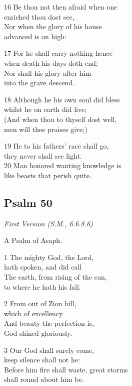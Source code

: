 \begin{multicols}{3}
16 Be thou not then afraid when one\\
enriched thou dost see,\\
Nor when the glory of his house\\
advanced is on high:

17 For he shall carry nothing hence\\
when death his days doth end;\\
Nor shall his glory after him\\
into the grave descend.

18 Although he his own soul did bless\\
whilst he on earth did live;\\
(And when thou to thyself dost well,\\
men will thee praises give;)

19 He to his fathers’ race shall go,\\
they never shall see light.\\
20 Man honored wanting knowledge is\\
like beasts that perish quite.

\begin{center}
\quad{}\quad{}
\end{center}

\subsection*{Psalm 50}

\emph{First Version (S.M., 6.6.8.6)}

A Psalm of Asaph.

1 The mighty God, the Lord,\\
hath spoken, and did call\\
The earth, from rising of the sun,\\
to where he hath his fall.

2 From out of Zion hill,\\
which of excellency\\
And beauty the perfection is,\\
God shined gloriously.

3 Our God shall surely come,\\
keep silence shall not he:\\
Before him fire shall waste, great storms\\
shall round about him be.


\end{multicols}
